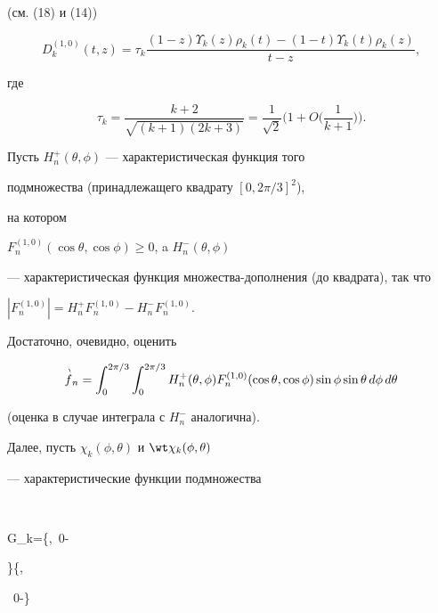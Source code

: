 (см. (18) и (14))


\begin{equation}


D_k^{(1,0)}(t,z)=\tau_k \frac{(1-z)\Upsilon_k (z)\rho_k(t)-


(1-t)\Upsilon_k (t)\rho_k (z)}{t-z},


\end{equation}


где


$$


\tau_k=\frac{k+2}{\sqrt {(k+1)(2k+3)}}=\frac{1}{\sqrt 2}


\bigg(1+O\bigg(\frac{1}{k+1}\bigg)\bigg).


$$





Пусть $ H^+_n (\theta,\phi)$ --- характеристическая функция того


подмножества (принадлежащего квадрату $[0,{2\pi}/{3}]^2$),


на котором


$F_n^{(1,0)}(\cos\theta, \cos\phi)\ge 0$, a $H^-_n (\theta, \phi)$


--- характеристическая функция множества-дополнения (до квадрата), так что


$|F_n^{(1,0)}|=H^+_n F_n^{(1,0)} -H^-_n F_n^{(1,0)}$.


Достаточно, очевидно, оценить


\begin{equation}


\boo{f}_n =\int_0^{{2\pi}/{3}} \int_0^{{2\pi}/{3}}


H^+_n (\theta, \phi) F_n^{(1,0)}(\cos \theta, \cos\phi)\sin \phi


\sin\theta\, d\phi\, d\theta


\end{equation}


(оценка в случае интеграла с $H_n^-$ аналогична).


Далее, пусть $\chi_k(\phi,\theta)$ и $\wt \chi_k(\phi,\theta)$


--- характеристические функции подмножества


$$


G_k=\bigg\{\le\phi\le{},\ 0\le\theta\le\phi-


\bigg\}\bigcup\bigg \{\le\theta\le{},


\ 0\le \phi \le\theta-\bigg\}



